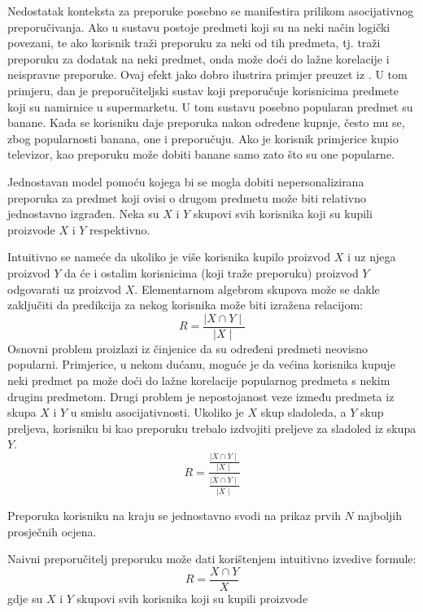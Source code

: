 \documentclass[times, utf8, diplomski, numeric]{fer}
\begin{document}
Nedostatak konteksta za preporuke posebno se manifestira prilikom asocijativnog
preporučivanja. Ako u sustavu postoje predmeti koji su na neki način logički
povezani, te ako korisnik traži preporuku za neki od tih predmeta, tj. traži
preporuku za dodatak na neki predmet, onda može doći do lažne korelacije i
neispravne preporuke. Ovaj efekt jako dobro ilustrira primjer preuzet iz
\cite{courseraRC}. U tom primjeru, dan je preporučiteljski sustav koji
preporučuje korisnicima predmete koji su namirnice u supermarketu. U tom sustavu
posebno popularan predmet su banane. Kada se korisniku daje preporuka nakon
određene kupnje, često mu se, zbog popularnosti banana, one i preporučuju. Ako
je korisnik primjerice kupio televizor, kao preporuku može dobiti banane samo
zato što su one popularne.


Jednostavan model pomoću kojega bi se mogla dobiti nepersonalizirana preporuka
za predmet koji ovisi o drugom predmetu može biti relativno jednostavno
izgrađen. Neka su $X$ i $Y$ skupovi svih korisnika koji su kupili proizvode $X$
i $Y$ respektivno.

Intuitivno se nameće da ukoliko je više korisnika kupilo proizvod $X$ i uz njega
proizvod $Y$ da će i ostalim korisnicima (koji traže preporuku) proizvod $Y$
odgovarati uz proizvod $X$. Elementarnom algebrom skupova može se dakle
zaključiti da predikcija za nekog korisnika može biti izražena relacijom:
\begin{equation}
\label{eq:naivnaNepersonaliziraniTemp}
	R = \frac{\mid X \cap Y \mid}{\mid X \mid}
\end{equation}
Osnovni problem proizlazi iz činjenice da su određeni predmeti neovisno
popularni. Primjerice, u nekom dućanu, moguće je da većina korisnika kupuje neki
predmet pa može doći do lažne korelacije popularnog predmeta s nekim drugim
predmetom. Drugi problem je nepostojanost veze između predmeta iz skupa $X$ i
$Y$ u smislu asocijativnosti. Ukoliko je $X$ skup sladoleda, a $Y$ skup
preljeva, korisniku bi kao preporuku trebalo izdvojiti preljeve za sladoled iz
skupa $Y$. 
\begin{equation}
\label{eq:nepersonalizirani}
	R = \frac
		{\frac
			{\mid X \cap Y \mid}
			{\mid X \mid}}
		{\frac
			{\mid \overline{X} \cap Y\mid}
			{\mid \overline{X} \mid}}
\end{equation}

Preporuka korisniku na kraju se jednostavno svodi na prikaz prvih $N$ najboljih
prosječnih ocjena.

Naivni preporučitelj preporuku može dati korištenjem intuitivno izvedive
formule:
\begin{equation}
\label{eq:naivnaNepersonalizirani}
	R = \frac{X \cap Y}{X}
\end{equation}
gdje su $X$ i $Y$ skupovi svih korisnika koji su kupili proizvode 
\end{document}

